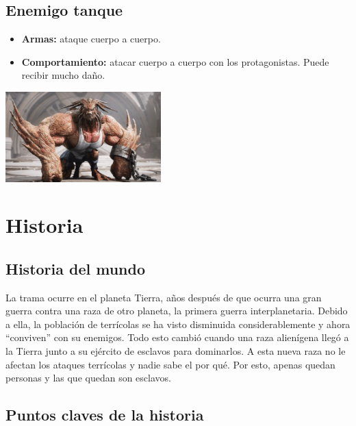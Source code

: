 \documentclass[11pt, twoside]{article}
\begin{document}
\subsection{Enemigo tanque}
\begin{itemize}
\item \textbf{Armas:} ataque cuerpo a cuerpo. 
\item \textbf{Comportamiento:} atacar cuerpo a cuerpo con los protagonistas. Puede recibir mucho daño. 
\end{itemize}

\begin{center}
\includegraphics[width=6cm]{./images/tanque.jpg}
\end{center}

\newpage
\pagestyle{insection}
\section{Historia}

\subsection{Historia del mundo}

La trama ocurre en el planeta Tierra, años después de que ocurra una gran guerra contra una raza de otro planeta, la primera guerra interplanetaria. Debido a ella, la población de terrícolas se ha visto disminuida considerablemente y ahora ``conviven'' con su enemigos. Todo esto cambió cuando una raza alienígena llegó a la Tierra junto a su ejército de esclavos para dominarlos. A esta nueva raza no le afectan los ataques terrícolas y nadie sabe el por qué. Por esto, apenas quedan personas y las que quedan son esclavos. 

\subsection{Puntos claves de la historia}
\end{document}
